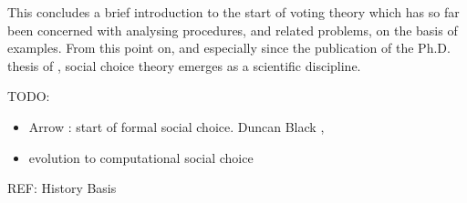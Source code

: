 This concludes a brief introduction to the start of voting theory which has so far been concerned with analysing procedures, and related problems, on the basis of examples. From this point on, and especially since the publication of the Ph.D. thesis of \citet{Arrow1951}, social choice theory emerges as a scientific discipline.







TODO:
\begin{itemize}
	\item Arrow \cite{Arrow1951}: start of formal social choice. Duncan Black \cite{Black1958}, \citet{Arrow2002,Arrow2011}
	\item evolution to computational social choice \cite{Comsoc2016}
\end{itemize}

REF:
History \citet{McLeanUrken1995,McLean1990,Urken2004} 
Basis \citet{Gaertner2006, Taylor2005, Nitzan2009}





